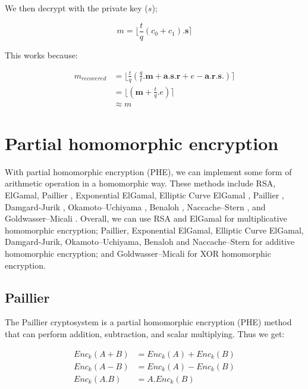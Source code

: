 \documentclass[envcountsame,runningheads,notitlepage]{llncs}
\begin{document}
We then decrypt with the private key ($s$);

\begin{equation}
m = \bigl \lfloor \frac{t}{q}(c_0+c_1).\mathbf{s} \bigr \rceil
\end{equation}

This works because:

\begin{align}
m_{recovered} &= \bigl \lfloor  \frac{t}{q}\left(\frac{q}{t}.\mathbf{m}  + \mathbf{a}.\mathbf{s}.\mathbf{r} + e -\mathbf{a}.\mathbf{r}.\mathbf{s}. \right) \bigr \rceil\\
&= \bigl \lfloor \left( \mathbf{m}  + \frac{t}{q}.e  \right) 
 \bigr \rceil\\
 & \approx m 
\end{align}


\section{Partial homomorphic encryption}
With partial homomorphic encryption (PHE), we can implement some form of arithmetic operation in a homomorphic way.  These methods include RSA, ElGamal, Paillier \cite{paillier1999public}, Exponential ElGamal, Elliptic Curve ElGamal \cite{elgamal1985public}, Paillier \cite{paillier1999public}, Damgard-Jurik \cite{damgaard2010generalization}, Okamoto–Uchiyama \cite{okamoto1998new}, Benaloh \cite{cohen1985robust}, Naccache–Stern \cite{naccache1997new}, and Goldwasser–Micali \cite{goldwasser2019probabilistic}. Overall, we can use RSA and ElGamal for multiplicative homomorphic encryption;  Paillier, Exponential ElGamal, Elliptic Curve ElGamal, Damgard-Jurik, Okamoto–Uchiyama, Benaloh and Naccache–Stern for additive homomorphic encryption; and Goldwasser–Micali for XOR homomorphic encryption.  

\subsection{Paillier}
The Paillier cryptosystem \cite{paillier1999public} is a partial homomorphic encryption (PHE) method that can perform addition, subtraction, and scalar multiplying. Thus we get:

\begin{align}
Enc_k(A + B) &= Enc_k(A) + Enc_k(B) \\
Enc_k(A - B) &= Enc_k(A) - Enc_k(B)  \\
Enc_k(A.B) &= A. Enc_k(B)  
\end{align}
\end{document}
